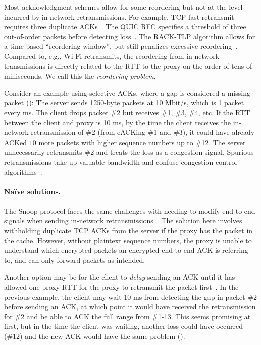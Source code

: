 Most acknowledgment schemes allow for some reordering but not at the level
incurred by in-network retransmissions. For example, TCP fast retransmit requires
three duplicate ACKs~\cite{rfc5681tcp}. The QUIC RFC specifies a threshold of three
out-of-order packets before detecting loss~\cite{rfc9002quic}. The RACK-TLP algorithm
allows for a time-based ``reordering window'', but still penalizes excessive
reordering~\cite{rfc8985}. Compared to, e.g., Wi-Fi retransmits, the
reordering from in-network transmissions is directly related to the RTT to
the proxy on the order of tens of milliseconds.
We call this the \textit{reordering problem}.

Consider an example using selective ACKs, where a gap is considered a missing
packet (): The server sends 1250-byte packets at 10 Mbit/s,
which is 1 packet every ms. The client drops packet \#2 but
receives \#1, \#3, \#4, etc. If the RTT between the client and proxy is 10 ms,
by the time the client receives the in-network retransmission of \#2 (from
eACKing \#1 and \#3), it could
have already ACKed $10$ more packets with higher sequence
numbers up to \#12. The server unnecessarily retransmits \#2 and treats the
loss as a congestion signal.
Spurious retransmissions take up valuable bandwidth and confuse congestion
control algorithms~\cite{leung2007overview}.

\paragraph{Na\"ive solutions.}

The Snoop protocol faces the same challenges with needing to modify end-to-end
signals when sending in-network retransmissions~\cite
{balakrishnan1995snoop}. The solution here involves withholding duplicate TCP
ACKs from the server if the proxy has the packet in the cache. However, without
plaintext sequence numbers, the \Sys proxy is unable to understand which
encrypted packets an encrypted end-to-end ACK is referring to, and can only
forward packets as intended.

Another option may be for the client to \textit{delay} sending an ACK until it
has allowed one proxy RTT for the proxy to retransmit the packet first~\cite{rfc3168}.
In the
previous example, the client may wait 10 ms from detecting the gap in
packet \#2 before sending an ACK, at which point it would have received the
retransmission for \#2 and be able to ACK the full range from \#1-13. This
seems promising at first, but in the time the client was waiting,
another loss could have occurred (\#12)
and the new ACK would have the same problem ().

